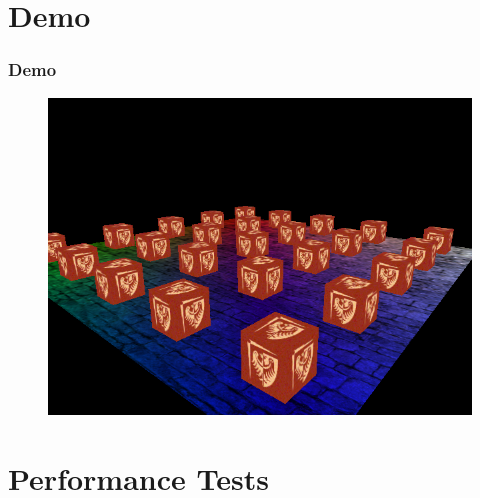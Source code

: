 \documentclass[ignorenonframetext,handout,english]{beamer}
\begin{document}
\section{Demo}

\frame
{
	\frametitle{Demo}
	{
		\begin{figure}
		\centering
		\includegraphics[scale=0.5]{demo.png}
		\end{figure}
	}
}



\section{Performance Tests}
\end{document}
